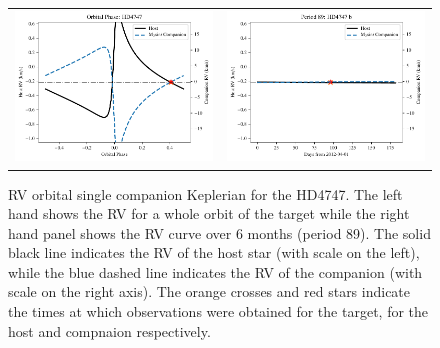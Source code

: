 \begin{figure}
    \centering
    \begin{tabular}{cc}
    \includegraphics[width=0.45\linewidth]{figures/direct-recovery/orbital-plots/HD4747_orbital_phase.pdf}& \includegraphics[width=0.45\linewidth]{figures/direct-recovery/orbital-plots/HD4747_p89.pdf}\\
    \end{tabular}
    \caption{RV orbital single companion Keplerian for the HD4747. The left hand shows the RV for a whole orbit of the target while the right hand panel shows the RV curve over 6 months (period 89). The solid black line indicates the RV of the host star (with scale on the left), while the blue dashed line indicates the RV of the companion (with scale on the right axis).  The orange crosses and red stars indicate the times at which observations were obtained for the target, for the host and compnaion respectively.}
    \label{fig:hd4747p89}
\end{figure}


